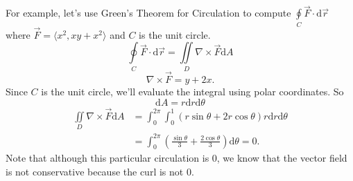 \noindent
For example, let's use Green's Theorem for Circulation to compute $\oint\limits_{C}{\vec{F} \cdot \mathrm{d}\vec{r}}$ where $\vec{F} = \langle x^2, xy + x^2 \rangle$ and $C$ is the unit circle.
\begin{equation*}
	\oint\limits_{C}{\vec{F} \cdot \mathrm{d}\vec{r}} = \iint\limits_{D}{\nabla \times \vec{F}\mathrm{d}A}
\end{equation*}
\begin{equation*}
	\nabla \times \vec{F} = y+2x.
\end{equation*}
Since $C$ is the unit circle, we'll evaluate the integral using polar coordinates. So 
\begin{equation*}
	\mathrm{d}A = r\mathrm{d}r\mathrm{d}\theta
\end{equation*}
\begin{align*}
	\iint\limits_{D}{\nabla \times \vec{F}\mathrm{d}A} &= \int_{0}^{2\pi}{\int_{0}^{1}{(r\sin{\theta} + 2r\cos{\theta})r\mathrm{d}r}\mathrm{d}\theta} \\
	&= \int_{0}^{2\pi}{\left(\frac{\sin{\theta}}{3} + \frac{2\cos{\theta}}{3}\right)\mathrm{d}\theta} = 0.
\end{align*}
Note that although this particular circulation is 0, we know that the vector field is not conservative because the curl is not 0.

